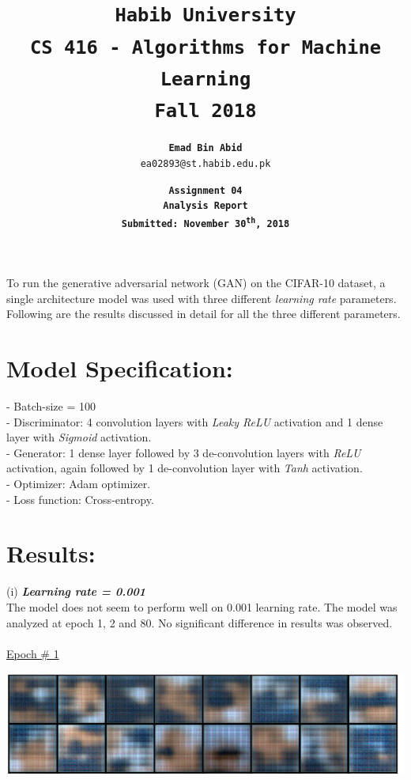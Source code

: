 \documentclass{exam}
\title{\textbf{\tt Habib University}\\ \textbf{\tt CS 416 - Algorithms for Machine Learning}\\ \textbf{\tt Fall 2018}}
\author{\textbf{\tt Emad Bin Abid}\\ {\tt ea02893@st.habib.edu.pk}}
\date{\textbf{\tt Assignment 04}\\ \textbf{\tt Analysis Report} \\\textbf{\tt Submitted: November 30\textsuperscript{th}, 2018}}
\begin{document}
\maketitle

To run the generative adversarial network (GAN) on the CIFAR-10 dataset, a single architecture model was used with three different \textit{learning rate} parameters. Following are the results discussed in detail for all the three different parameters.\\

\section*{Model Specification:}
 - Batch-size = 100\\
 - Discriminator: 4 convolution layers with \textit{Leaky ReLU} activation and 1 dense layer with \textit{Sigmoid} activation.\\
 - Generator: 1 dense layer followed by 3 de-convolution layers with \textit{ReLU} activation, again followed by 1 de-convolution layer with \textit{Tanh} activation.\\
 - Optimizer: Adam optimizer.\\
 - Loss function: Cross-entropy.\\

\pagebreak
 
\section*{Results:}

(i) \textbf{\textit{Learning rate = 0.001}}\\

The model does not seem to perform well on 0.001 learning rate. The model was analyzed at epoch 1, 2 and 80. No significant difference in results was observed.\\ \\

\underline{Epoch \# 1}
\begin{center}
	\includegraphics[scale=0.7]{../assets/model-1-1}
\end{center}
\end{document}
